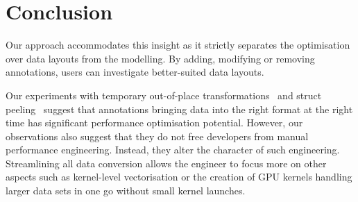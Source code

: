 \section{Conclusion}
\label{section:conclusion}
%
% 
%
%



Our approach accommodates this insight as it strictly separates the optimisation over data layouts from the modelling.
By adding, modifying or removing annotations, users can investigate better-suited data layouts.


Our experiments with temporary out-of-place transformations~\cite{Sung:2012:DataLayoutTransformations} and struct peeling~\cite{Hundt:2006:StructureLayoutOptimisation} suggest that annotations bringing data into the right format at the right time has significant performance optimisation potential.
However, our observations also suggest that they do not free developers from manual performance engineering.
Instead, they alter the character of such engineering.
Streamlining all data conversion allows the engineer to focus more on other aspects such as kernel-level vectorisation or the creation of GPU kernels handling larger data sets in one go without small kernel launches.


